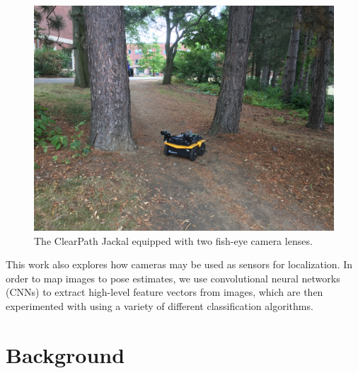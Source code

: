 \documentclass[letterpaper, 12 pt, conference]{ieeeconf}  %
\begin{document}
\begin{figure}[h]
\centering
\includegraphics[scale=0.07]{JackalPose}
\caption{The ClearPath Jackal equipped with two fish-eye camera lenses.}
\end{figure}

\par 
This work also explores how cameras may be used as sensors for localization. In order to map images to pose estimates, we use convolutional neural networks (CNNs) to extract high-level feature vectors from images, which are then experimented with using a variety of different classification algorithms. 

\section{Background}
\end{document}
